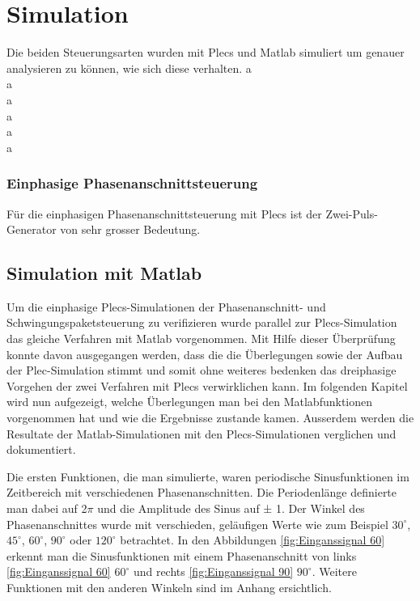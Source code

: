\section{Simulation}
Die beiden Steuerungsarten wurden mit Plecs und Matlab simuliert um genauer analysieren zu können, wie sich diese verhalten. 
a\\
a\\
a\\
a\\
a\\
a\\


\subsubsection{Einphasige Phasenanschnittsteuerung}
Für die einphasigen Phasenanschnittsteuerung mit Plecs ist der Zwei-Puls-Generator von sehr grosser Bedeutung. 



\subsection{Simulation mit Matlab}
Um die einphasige Plecs-Simulationen der Phasenanschnitt- und Schwingungspaketsteuerung zu verifizieren wurde parallel zur Plecs-Simulation das gleiche Verfahren mit Matlab vorgenommen. Mit Hilfe dieser Überprüfung konnte davon ausgegangen werden, dass die die Überlegungen sowie der Aufbau der Plec-Simulation stimmt und somit ohne weiteres bedenken das dreiphasige Vorgehen der zwei Verfahren mit Plecs verwirklichen kann. Im folgenden Kapitel wird nun aufgezeigt, welche Überlegungen man bei den Matlabfunktionen vorgenommen hat und wie die Ergebnisse zustande kamen. Ausserdem werden die Resultate der Matlab-Simulationen mit den Plecs-Simulationen verglichen und dokumentiert.

Die ersten Funktionen, die man simulierte, waren periodische Sinusfunktionen im Zeitbereich mit verschiedenen Phasenanschnitten. Die Periodenlänge definierte man dabei auf 2$\pi$ und die Amplitude des Sinus auf ± 1. Der Winkel des Phasenanschnittes wurde mit verschieden, geläufigen Werte wie zum Beispiel $30^\circ$, $45^\circ$, $60^\circ$, $90^\circ$ oder $120^\circ$ betrachtet. In den Abbildungen \ref{fig:Einganssignal 60} erkennt man die Sinusfunktionen mit einem Phasenanschnitt von links \ref{fig:Einganssignal 60} $60^\circ$ und rechts \ref{fig:Einganssignal 90} $90^\circ$. Weitere Funktionen mit den anderen Winkeln sind im Anhang ersichtlich.
 

